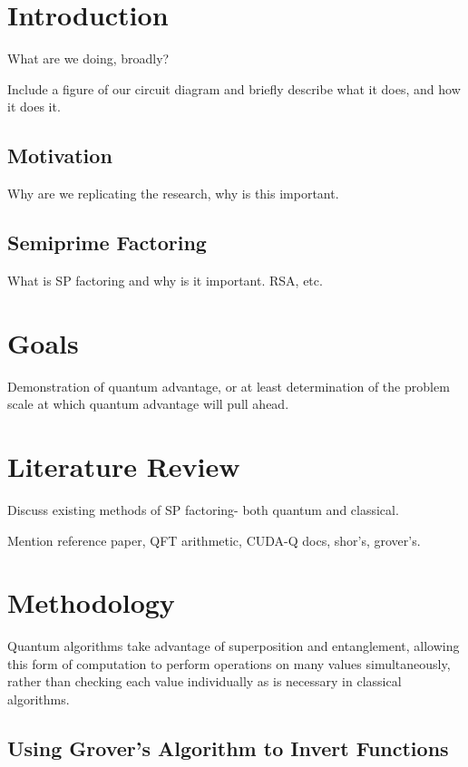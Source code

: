 \documentclass[twocolumn]{cinc}
\begin{document}
\section{Introduction}

What are we doing, broadly?

Include a figure of our circuit diagram and briefly describe what it 
does, and how it does it.

  \subsection{Motivation}

  Why are we replicating the research, why is this important.

  \subsection{Semiprime Factoring}  

  What is SP factoring and why is it important. RSA, etc.

\section{Goals}

Demonstration of quantum advantage, or at least determination of
the problem scale at which quantum advantage will pull ahead. 

\section{Literature Review}

Discuss existing methods of SP factoring- both quantum and classical.

Mention reference paper, QFT arithmetic, CUDA-Q docs, shor's, grover's.

\section{Methodology}
 
Quantum algorithms take advantage of superposition and entanglement,
allowing this form of computation to perform operations on many 
values simultaneously, rather than checking each value individually
as is necessary in classical algorithms.

  \subsection{Using Grover's Algorithm to Invert Functions} 
\end{document}
